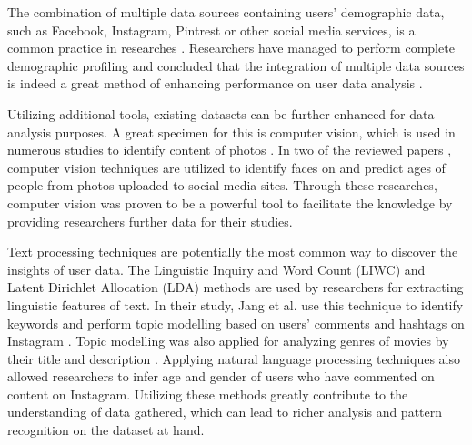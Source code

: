   The combination of multiple data sources containing users' demographic data, such as Facebook, Instagram, Pintrest or other social media services, is a common practice in researches \cite{farseev2015harvestingmultiplesources, ottoni2013ladies}. Researchers have managed to perform complete demographic profiling and concluded that the integration of multiple data sources is indeed a great method of enhancing performance on user data analysis \cite{farseev2015harvestingmultiplesources}. 
  
  Utilizing additional tools, existing datasets can be further enhanced for data analysis purposes. A great specimen for this is computer vision, which is used in numerous studies to identify content of photos \cite{hu2014we, farseev2015harvestingmultiplesources}. In two of the reviewed papers \cite{han2016teensarefrommars, bakhshi2014faces}, computer vision techniques are utilized to identify faces on and predict ages of people from photos uploaded to social media sites. Through these researches, computer vision was proven to be a powerful tool to facilitate the knowledge by providing researchers further data for their studies. 

  Text processing techniques are potentially the most common way to discover the insights of user data. The Linguistic Inquiry and Word Count (LIWC) and Latent Dirichlet Allocation (LDA) methods are used by researchers \cite{ottoni2013ladies, farseev2015harvestingmultiplesources, jang2016teensengagemorewithfewerphotos} for extracting linguistic features of text. In their study, Jang et al. use this technique to identify keywords and perform topic modelling based on users' comments and hashtags on Instagram \cite{jang2016teensengagemorewithfewerphotos}. Topic modelling was also applied for analyzing genres of movies by their title and description \cite{kabinsingha2012movie}. Applying natural language processing techniques also allowed researchers to infer age and gender of users \cite{han2016teensarefrommars} who have commented on content on Instagram. Utilizing these methods greatly contribute to the understanding of data gathered, which can lead to richer analysis and pattern recognition on the dataset at hand. 

